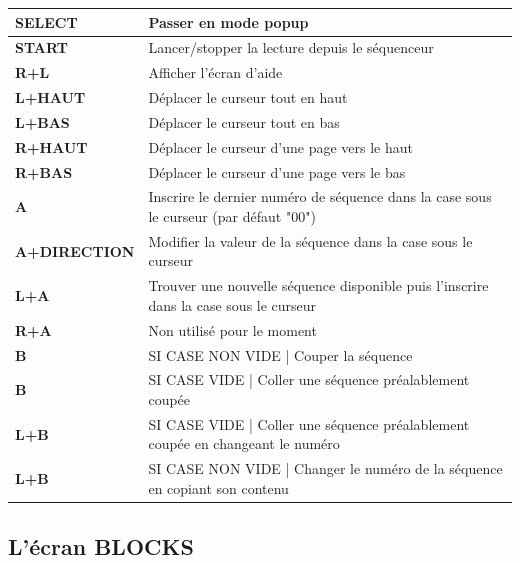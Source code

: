 \documentclass[12pt,a4paper]{article}
\begin{document}
        \tablelasttail{\hline}
        \begin{supertabular}{|l|p{11cm}|}
        \hline
            {\bf SELECT} & Passer en mode popup \\
            \hline
            {\bf START} & Lancer/stopper la lecture depuis le séquenceur \\
            \hline
            {\bf R+L} & Afficher l'écran d'aide \\
            \hline
            {\bf L+HAUT} & Déplacer le curseur tout en haut \\
            \hline
            {\bf L+BAS} & Déplacer le curseur tout en bas \\
            \hline
            {\bf R+HAUT} & Déplacer le curseur d'une page vers le haut \\
            \hline
            {\bf R+BAS} & Déplacer le curseur d'une page vers le bas \\
            \hline
            {\bf A} & Inscrire le dernier numéro de séquence dans la case sous le curseur (par défaut "00") \\
            \hline
            {\bf A+DIRECTION} & Modifier la valeur de la séquence dans la case sous le curseur \\
            \hline
            {\bf L+A} & Trouver une nouvelle séquence disponible puis l'inscrire dans la case sous le curseur \\
            \hline
            {\bf R+A} & Non utilisé pour le moment \\
            \hline
            {\bf B} & SI CASE NON VIDE | Couper la séquence \\
            \hline
            {\bf B} & SI CASE VIDE | Coller une séquence préalablement coupée \\
            \hline
            {\bf L+B} & SI CASE VIDE | Coller une séquence préalablement coupée en changeant le numéro \\
            \hline
            {\bf L+B} & SI CASE NON VIDE | Changer le numéro de la séquence en copiant son contenu \\
        \hline
        \end{supertabular}

    \subsection{L'écran BLOCKS}
\end{document}
